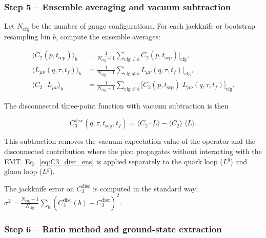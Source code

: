 \documentclass[11pt,a4paper]{article}
\begin{document}
\subsubsection{Step 5 -- Ensemble averaging and vacuum subtraction}
\label{sec:analysis_step5}

Let $N_{\text{cfg}}$ be the number of gauge configurations.  For each jackknife or bootstrap
resampling bin $b$, compute the ensemble averages:

\begin{align}
  \langle C_2(p, t_{\text{sep}}) \rangle_b
    &= \frac{1}{N_{\text{cfg}} - 1} \sum_{\text{cfg} \neq b}
       C_2(p, t_{\text{sep}})\big|_{\text{cfg}}, \label{eq:avg_C2} \\[4pt]
  \langle L_{\mu\nu}(q, \tau, t_f) \rangle_b
    &= \frac{1}{N_{\text{cfg}} - 1} \sum_{\text{cfg} \neq b}
       L_{\mu\nu}(q, \tau, t_f)\big|_{\text{cfg}}, \label{eq:avg_L} \\[4pt]
  \langle C_2 \cdot L_{\mu\nu} \rangle_b
    &= \frac{1}{N_{\text{cfg}} - 1} \sum_{\text{cfg} \neq b}
       \big[ C_2(p, t_{\text{sep}}) \; L_{\mu\nu}(q, \tau, t_f) \big]_{\text{cfg}}. \label{eq:avg_C2L}
\end{align}

The disconnected three-point function with vacuum subtraction is then

\begin{equation}\label{eq:C3_disc_ens}
  \boxed{
    C_3^{\text{disc}}(q, \tau, t_{\text{sep}}, t_f)
      = \langle C_2 \cdot L \rangle
      - \langle C_2 \rangle \; \langle L \rangle
  }.
\end{equation}

This subtraction removes the vacuum expectation value of the operator and the
disconnected contribution where the pion propagates without interacting with the EMT.
Eq.~\eqref{eq:C3_disc_ens} is applied separately to the quark loop ($L^q$) and gluon loop ($L^g$).

The jackknife error on $C_3^{\text{disc}}$ is computed in the standard way:
$\sigma^2 = \frac{N_{\text{cfg}} - 1}{N_{\text{cfg}}} \sum_b (C_3^{\text{disc}}(b) - \overline{C_3^{\text{disc}}})^2$.

\subsubsection{Step 6 -- Ratio method and ground-state extraction}
\label{sec:analysis_step6}
\end{document}
